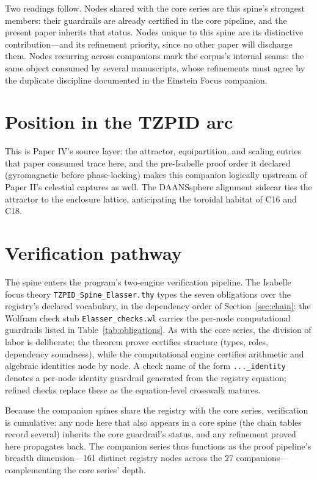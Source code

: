 \documentclass[11pt]{article}
\theoremstyle{remark}
\begin{document}
Two readings follow. Nodes shared with the core series are this spine's strongest members: their guardrails are already certified in the core pipeline, and the present paper inherits that status. Nodes unique to this spine are its distinctive contribution---and its refinement priority, since no other paper will discharge them. Nodes recurring across companions mark the corpus's internal seams: the same object consumed by several manuscripts, whose refinements must agree by the duplicate discipline documented in the Einstein Focus companion.

\section{Position in the TZPID arc}
\label{sec:arc}

This is Paper IV's source layer: the attractor, equipartition, and scaling entries that paper consumed trace here, and the pre-Isabelle proof order it declared (gyromagnetic before phase-locking) makes this companion logically upstream of Paper II's celestial captures as well. The DAANSsphere alignment sidecar ties the attractor to the enclosure lattice, anticipating the toroidal habitat of C16 and C18.

\section{Verification pathway}
\label{sec:verify}

The spine enters the program's two-engine verification pipeline. The Isabelle focus theory \texttt{TZPID\_Spine\_Elasser.thy} types the seven obligations over the registry's declared vocabulary, in the dependency order of Section~\ref{sec:chain}; the Wolfram check stub \texttt{Elasser\_checks.wl} carries the per-node computational guardrails listed in Table~\ref{tab:obligations}. As with the core series, the division of labor is deliberate: the theorem prover certifies structure (types, roles, dependency soundness), while the computational engine certifies arithmetic and algebraic identities node by node. A check name of the form \texttt{...\_identity} denotes a per-node identity guardrail generated from the registry equation; refined checks replace these as the equation-level crosswalk matures.

Because the companion spines share the registry with the core series, verification is cumulative: any node here that also appears in a core spine (the chain tables record several) inherits the core guardrail's status, and any refinement proved here propagates back. The companion series thus functions as the proof pipeline's breadth dimension---161 distinct registry nodes across the 27 companions---complementing the core series' depth.
\end{document}
